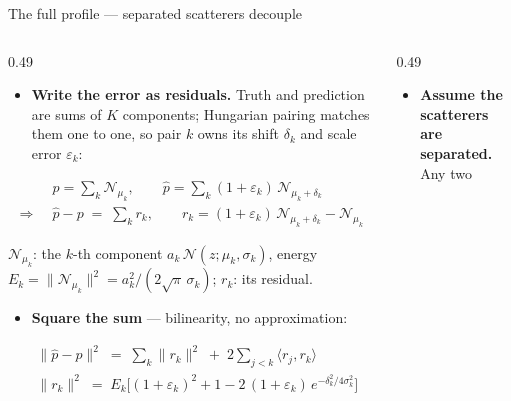 \begin{frame}{The full profile --- separated scatterers decouple}
  \setlength{\abovedisplayskip}{3pt}
  \setlength{\belowdisplayskip}{3pt}
  \begin{columns}[c]
    \begin{column}{0.49\textwidth}
      \small
      \begin{itemize}
        \item \textbf{Write the error as residuals.} Truth and
              prediction are sums of $K$ components; Hungarian pairing matches
              them one to one, so pair $k$ owns its shift $\delta_k$ and scale
              error $\varepsilon_k$:
      \end{itemize}
      \[
      \begin{aligned}
        & p = \textstyle\sum_{k} \mathcal N_{\mu_k}, \qquad \hat p = \textstyle\sum_{k} (1{+}\varepsilon_k)\,\mathcal N_{\mu_k+\delta_k}\\[3pt]
        \Longrightarrow\;\; & \hat p - p \;=\; \textstyle\sum_{k} r_k, \qquad r_k = (1{+}\varepsilon_k)\,\mathcal N_{\mu_k+\delta_k} - \mathcal N_{\mu_k}
      \end{aligned}
      \]
      {\scriptsize\color{soft} $\mathcal N_{\mu_k}$: the $k$-th component
      $a_k\,\mathcal N(z;\mu_k,\sigma_k)$, energy
      $E_k=\lVert\mathcal N_{\mu_k}\rVert^2=a_k^2/(2\sqrt{\pi}\,\sigma_k)$;
      $r_k$: its residual.\par}
      \vspace{16pt}
      \begin{itemize}
        \item \textbf{Square the sum} --- bilinearity, no approximation:
      \end{itemize}
      \[
      \begin{aligned}
        & \lVert \hat p - p \rVert^2 \;=\; \textstyle\sum_{k} \lVert r_k \rVert^2 \;+\; 2\textstyle\sum_{j<k} \langle r_j, r_k \rangle\\[3pt]
        & \lVert r_k \rVert^2 \;=\; E_k\big[(1{+}\varepsilon_k)^2 + 1 - 2\,(1{+}\varepsilon_k)\,e^{-\delta_k^2/4\sigma_k^2}\big]
      \end{aligned}
      \]
    \end{column}
    \begin{column}{0.49\textwidth}
      \small
      \begin{itemize}
        \item \textbf{Assume the scatterers are separated.} Any two

\end{itemize}
\end{column}
\end{columns}
\end{frame}
